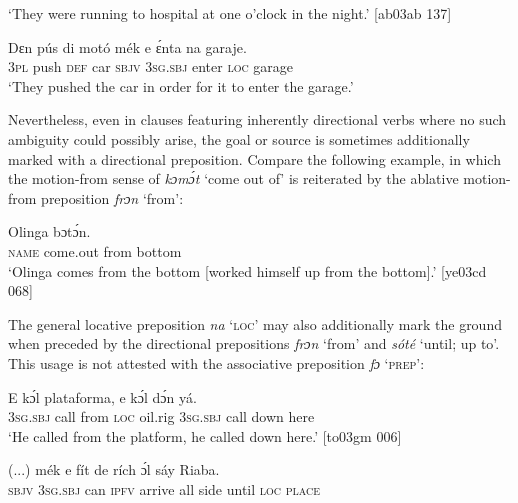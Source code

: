 \glt ‘They were running to hospital at one o’clock in the night.’ [ab03ab 137]
\z


\ea%
    \label{ex:key:978}
    \gll Dɛn  pús    di  motó  mék    e    ɛ́nta  na  garaje.\\
\textsc{3pl}  push  \textsc{def}  car    \textsc{sbjv}    \textsc{3sg.sbj}  enter  \textsc{loc}  garage\\

\glt ‘They pushed the car in order for it to enter the garage.’
\z

Nevertheless, even in clauses featuring inherently directional verbs where no such ambiguity could possibly arise, the goal or source is sometimes additionally marked with a directional preposition. Compare the following example, in which the motion-from sense of \textit{kɔmɔ́t} ‘come out of’ is reiterated by the ablative motion-from preposition \textit{frɔn} ‘from’:


\ea%
    \label{ex:key:979}
    \gll Olinga          bɔtɔ́n.\\
\textsc{name}  come.out  from  bottom\\

\glt ‘Olinga comes from the bottom [worked himself up from the bottom].’ [ye03cd 068]
\z

The general locative preposition \textit{na} ‘\textsc{loc}’ may also additionally mark the ground when preceded by the directional prepositions \textit{frɔn} ‘from’ and \textit{sóté} ‘until; up to’. This usage is not attested with the associative preposition \textit{fɔ} ‘\textsc{prep’}:


\ea%
    \label{ex:key:980}
    \gll E    kɔ́l       plataforma,  e    kɔ́l  dɔ́n    yá.\\
\textsc{3sg.sbj}  call  from  \textsc{loc}  oil.rig    \textsc{3sg.sbj}  call  down  here\\

\glt ‘He called from the platform, he called down here.’ [to03gm 006]
\z


\ea%
    \label{ex:key:981}
    \gll (...)  mék  e    fít  de  rích    ɔ́l  sáy       Riaba.\\
{}  \textsc{sbjv}  \textsc{3sg.sbj}  can  \textsc{ipfv}  arrive  all  side  until  \textsc{loc}  \textsc{place}\\

